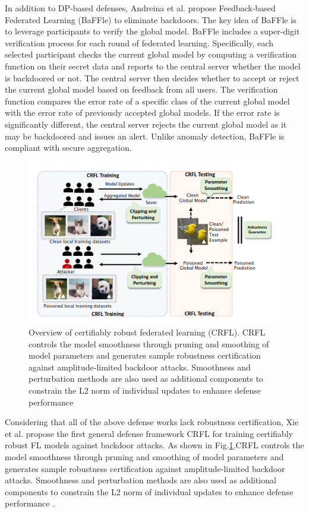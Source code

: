 \documentclass[conference]{IEEEtran}
\begin{document}
In addition to DP-based defenses, Andreina et al. \cite{b85}propose Feedback-based Federated Learning (BaFFle) to eliminate backdoors.
The key idea of BaFFle is to leverage participants to verify the global model. BaFFle includes a super-digit verification process for each
round of federated learning. Specifically, each selected participant checks the current global model by computing a verification function on
their secret data and reports to the central server whether the model is backdoored or not. The central server then decides whether
to accept or reject the current global model based on feedback from all users. The verification function compares the error rate of
a specific class of the current global model with the error rate of previously accepted global models. If the error rate is significantly different,
the central server rejects the current global model as it may be backdoored and issues an alert. Unlike anomaly detection, BaFFle is compliant with secure aggregation.

\begin{figure}[htbp]
    \centerline{\includegraphics[width=0.8\linewidth,height=0.6\linewidth]{picture/CRFL.png}}
    \caption{Overview of certifiably robust federated learning (CRFL). CRFL controls the model smoothness through pruning and smoothing of model parameters and generates sample robustness
    certification against amplitude-limited backdoor attacks. Smoothness and perturbation methods are also used as 
    additional components to constrain the L2 norm of individual updates to enhance defense performance}
    \label{fig11}
\end{figure}


Considering that all of the above defense works lack robustness certification,
Xie et al. \cite{b86} propose the first general defense framework CRFL for training certifiably robust FL models against backdoor attacks.
As shown in Fig.\ref{fig11},CRFL controls the model smoothness through pruning and smoothing of model parameters and generates sample robustness
certification against amplitude-limited backdoor attacks. Smoothness and perturbation methods are also used as
additional components to constrain the L2 norm of individual updates to enhance defense performance \cite{b87}.
\end{document}
